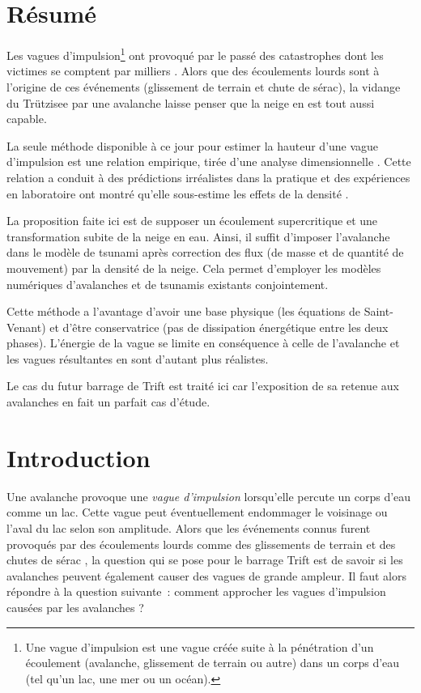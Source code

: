 
\section*{Résumé}

Les vagues d'impulsion\footnote{Une vague d'impulsion est une vague créée suite à la pénétration d'un écoulement (avalanche, glissement de terrain ou autre) dans un corps d'eau (tel qu'un lac, une mer ou un océan).} ont provoqué par le passé des catastrophes dont les victimes se comptent par milliers \citep{Vajont, Palcacocha}. Alors que des écoulements lourds sont à l'origine de ces événements (glissement de terrain et chute de sérac), la vidange du Trützisee \citep{Trutzisee} par une avalanche laisse penser que la neige en est tout aussi capable.

La seule méthode disponible à ce jour pour estimer la hauteur d'une vague d'impulsion est une relation empirique, tirée d'une analyse dimensionnelle \citep{heller}. Cette relation a conduit à des prédictions irréalistes dans la pratique et des expériences en laboratoire ont montré qu'elle sous-estime les effets de la densité \citep{zitti}.

La proposition faite ici est de supposer un écoulement supercritique et une transformation subite de la neige en eau. Ainsi, il suffit d'imposer l'avalanche dans le modèle de tsunami après correction des flux (de masse et de quantité de mouvement) par la densité de la neige. Cela permet d'employer les modèles numériques d'avalanches et de tsunamis existants conjointement.

Cette méthode a l'avantage d'avoir une base physique (les équations de Saint-Venant) et d'être conservatrice (pas de dissipation énergétique entre les deux phases). L'énergie de la vague se limite en conséquence à celle de l'avalanche et les vagues résultantes en sont d'autant plus réalistes.

Le cas du futur barrage de Trift \citep{manso} est traité ici car l'exposition de sa retenue aux avalanches en fait un parfait cas d'étude.

\section{Introduction}

Une avalanche provoque une \emph{vague d'impulsion} lorsqu'elle percute un corps d'eau comme un lac. Cette vague peut éventuellement endommager le voisinage ou l'aval du lac selon son amplitude. Alors que les événements connus furent provoqués par des écoulements lourds comme des glissements de terrain \citep{Vajont} et des chutes de sérac \citep{Palcacocha}, la question qui se pose pour le barrage Trift est de savoir si les avalanches peuvent également causer des vagues de grande ampleur. Il faut alors répondre à la question suivante~: comment approcher les vagues d'impulsion causées par les avalanches ?
